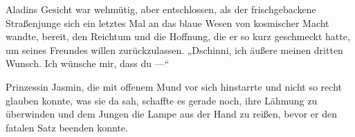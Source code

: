 Aladins Gesicht war wehmütig, aber entschlossen, als der frischgebackene Straßenjunge sich ein letztes Mal an das blaue Wesen von kosmischer Macht wandte, bereit, den Reichtum und die Hoffnung, die er so kurz geschmeckt hatte, um seines Freundes willen zurückzulassen.
„Dschinni, ich äußere meinen dritten Wunsch. Ich wünsche mir, dass du —“

Prinzessin Jasmin, die mit offenem Mund vor sich hinstarrte und nicht so recht glauben konnte, was sie da sah, schaffte es gerade noch, ihre Lähmung zu überwinden und dem Jungen die Lampe aus der Hand zu reißen, bevor er den fatalen Satz beenden konnte.

